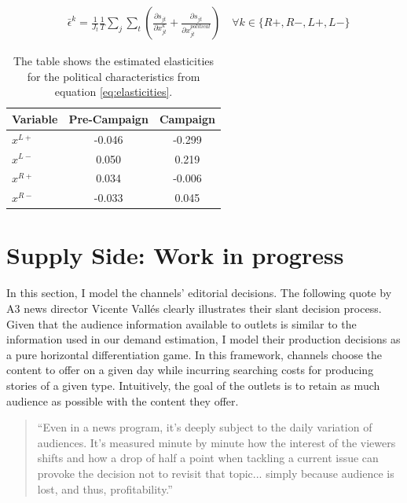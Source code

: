 \documentclass[12pt]{article}
\begin{document}
	\begin{equation}\label{eq:elasticities}
		\begin{aligned}
			& \bar{\epsilon}^k= \frac{1}{J_t}\frac{1}{T}\sum_{j}\sum_{t} \left(\frac{\partial s_{jt}}{\partial x_{jt}^k} +  \frac{\partial s_{jt}}{\partial x_{jt}^{political}} \right)\quad \forall k \in \{R+,R-,L+,L-\}
		\end{aligned}
	\end{equation}             
	
	
	
	
	\begin{table}[H]
		\centering
		\begin{tabular}{|l|c|c|}
			\hline
			\textbf{Variable} & \textbf{Pre-Campaign} & \textbf{Campaign} \\
			\hline
			$x^{L+}$ & -0.046 & -0.299 \\
   $x^{L-}$& 0.050 & 0.219 \\
			$x^{R+}$ & 0.034 & -0.006 \\
			$x^{R-}$ & -0.033 & 0.045 \\
			\hline
		\end{tabular}
		\caption{The table shows the estimated elasticities for the political characteristics from equation \ref{eq:elasticities}.}
		\label{tab:elasticities_comparison}
	\end{table}
	
	
	
	
	
	
	\section{Supply Side: Work in progress}
	



	
	In this section, I model the channels' editorial decisions. The following quote by A3 news director Vicente Vallés clearly illustrates their slant decision process. Given that the audience information available to outlets is similar to the information used in our demand estimation, I model their production decisions as a pure horizontal differentiation game. In this framework, channels choose the content to offer on a given day while incurring searching costs for producing stories of a given type. Intuitively, the goal of the outlets is to retain as much audience as possible with the content they offer.
	
	\begin{quote}
		``Even in a news program, it’s deeply subject to the daily variation of audiences. It’s measured minute by minute how the interest of the viewers shifts and how a drop of half a point when tackling a current issue can provoke the decision not to revisit that topic... simply because audience is lost, and thus, profitability.''
	\end{quote}
	\hspace*{}
	
\end{document}
